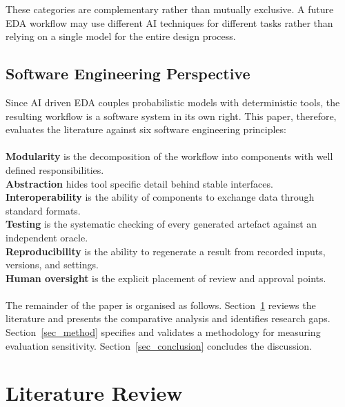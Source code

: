 \documentclass[conference]{IEEEtran}
\begin{document}
\noindent These categories are complementary rather than mutually exclusive. A future EDA workflow may use different AI techniques for different tasks rather than relying on a single model for the entire design process.

\subsection{Software Engineering Perspective} \label{B4}

\noindent Since AI driven EDA couples probabilistic models with deterministic tools, the resulting workflow is a software system in its own right. This paper, therefore, evaluates the literature against six software engineering principles: \\\\
\textbf{Modularity} is the decomposition of the workflow into components with well defined responsibilities. \\ \textbf{Abstraction} hides tool specific detail behind stable interfaces. \\
\textbf{Interoperability} is the ability of components to exchange data through standard formats.\\
\textbf{Testing} is the systematic checking of every generated artefact against an independent oracle. 
\\
\textbf{Reproducibility} is the ability to regenerate a result from recorded inputs, versions, and settings. \\
\textbf{Human oversight} is the explicit placement of review and approval points. \\\\
 The remainder of the paper is organised as follows. Section~\ref{sec_litrev} reviews the literature and presents the comparative analysis and identifies research gaps. Section~\ref{sec_method} specifies and validates a methodology for measuring evaluation sensitivity. Section~\ref{sec_conclusion} concludes the discussion.

\section{Literature Review}\label{sec_litrev}
\end{document}
